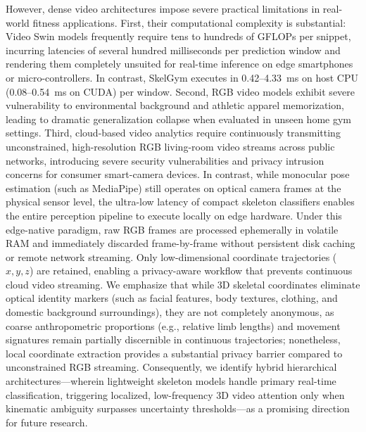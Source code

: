 \documentclass[runningheads]{llncs}
\begin{document}
However, dense video architectures impose severe practical limitations in real-world fitness applications. First, their computational complexity is substantial: Video Swin models frequently require tens to hundreds of GFLOPs per snippet, incurring latencies of several hundred milliseconds per prediction window and rendering them completely unsuited for real-time inference on edge smartphones or micro-controllers. In contrast, SkelGym executes in 0.42--4.33~ms on host CPU (0.08--0.54~ms on CUDA) per window. Second, RGB video models exhibit severe vulnerability to environmental background and athletic apparel memorization, leading to dramatic generalization collapse when evaluated in unseen home gym settings. Third, cloud-based video analytics require continuously transmitting unconstrained, high-resolution RGB living-room video streams across public networks, introducing severe security vulnerabilities and privacy intrusion concerns for consumer smart-camera devices. In contrast, while monocular pose estimation (such as MediaPipe) still operates on optical camera frames at the physical sensor level, the ultra-low latency of compact skeleton classifiers enables the entire perception pipeline to execute locally on edge hardware. Under this edge-native paradigm, raw RGB frames are processed ephemerally in volatile RAM and immediately discarded frame-by-frame without persistent disk caching or remote network streaming. Only low-dimensional coordinate trajectories ($x, y, z$) are retained, enabling a privacy-aware workflow that prevents continuous cloud video streaming. We emphasize that while 3D skeletal coordinates eliminate optical identity markers (such as facial features, body textures, clothing, and domestic background surroundings), they are not completely anonymous, as coarse anthropometric proportions (e.g., relative limb lengths) and movement signatures remain partially discernible in continuous trajectories; nonetheless, local coordinate extraction provides a substantial privacy barrier compared to unconstrained RGB streaming. Consequently, we identify hybrid hierarchical architectures---wherein lightweight skeleton models handle primary real-time classification, triggering localized, low-frequency 3D video attention only when kinematic ambiguity surpasses uncertainty thresholds---as a promising direction for future research.
\end{document}
